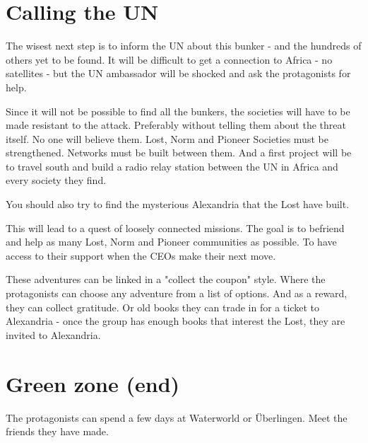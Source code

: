 \section{Calling the UN}

The wisest next step is to inform the UN about this bunker - and the hundreds of others yet to be found. It will be difficult to get a connection to Africa - no satellites - but the UN ambassador will be shocked and ask the protagonists for help.

Since it will not be possible to find all the bunkers, the societies will have to be made resistant to the attack. Preferably without telling them about the threat itself. No one will believe them. Lost, Norm and Pioneer Societies must be strengthened. Networks must be built between them. And a first project will be to travel south and build a radio relay station between the UN in Africa and every society they find.

You should also try to find the mysterious Alexandria that the Lost have built.

This will lead to a quest of loosely connected missions. The goal is to befriend and help as many Lost, Norm and Pioneer communities as possible. To have access to their support when the CEOs make their next move.

These adventures can be linked in a "collect the coupon" style. Where the protagonists can choose any adventure from a list of options. And as a reward, they can collect gratitude. Or old books they can trade in for a ticket to Alexandria - once the group has enough books that interest the Lost, they are invited to Alexandria.

\section{Green zone (end)}

The protagonists can spend a few days at Waterworld or Überlingen. Meet the friends they have made.


